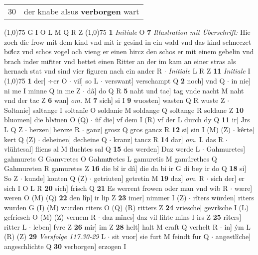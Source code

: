 \documentclass[8pt,a4paper,notitlepage]{article}
\begin{document}
\begin{table}[ht]
\begin{minipage}[t]{0.5\linewidth}
\begin{tabular}{rl}
30 & der knabe alsus \textbf{verborgen} wart\\ 
\end{tabular}
\scriptsize
\line(1,0){75} \newline
G I O L M Q R Z \newline
\line(1,0){75} \newline
\textbf{1} \textit{Initiale} O  \textbf{7} \textit{Illustration mit Überschrift:} Hie zoch die frow mit dem kind vnd mit ir gesind in ein wald vnd das kind schneczet boͯlcz vnd schos vogel och vieng er einen hircz den schos er mit einem gebelin vnd brach inder muͦtter vnd bettet einen Ritter an der im kam an einer stras als hernach stat vnd sind vier figuren nach ein ander R   $\cdot$ \textit{Initiale} L R Z  \textbf{11} \textit{Initiale} I  \newline
\line(1,0){75} \newline
\textbf{1} der] ÷er O  $\cdot$ vil] so L  $\cdot$ verswant] verschampt Q \textbf{2} noch] vnd Q  $\cdot$ in nie] ni me I minne Q in me Z  $\cdot$ dâ] do Q R \textbf{5} naht und tac] tag vnde nacht M naht vnd der tac Z \textbf{6} wan] \textit{om.} M \textbf{7} sich] si I \textbf{9} wuosten] wasten Q R wuste Z  $\cdot$ Soltanie] saltange I soltanîe O soldanie M soldange Q soltange R soldane Z \textbf{10} bluomen] die blvͦmen O (Q)  $\cdot$ ûf die] vf dem I (R) vf der L durch dy Q \textbf{11} ir] Jrs L Q Z  $\cdot$ herzen] hercze R  $\cdot$ ganz] grosz Q gros gancz R \textbf{12} si] sin I (M) (Z)  $\cdot$ kêrte] kert Q (Z)  $\cdot$ deheinen] decheine Q  $\cdot$ kranz] tancz R \textbf{14} dar] \textit{om.} L das R  $\cdot$ vlühtesal] fliens al M fluchtes sal Q \textbf{15} des werden] Daz werde L  $\cdot$ Gahmuretes] gahmurets G Gamvretes O Gahmuͯretes L gamuretis M gamúrethes Q Gahmureten R gamuretes Z \textbf{16} die bî ir dâ] die da bi ir G di bey ir do Q \textbf{18} si] So Z  $\cdot$ kunde] konten Q (Z)  $\cdot$ getriuten] getretin M \textbf{19} daz] \textit{om.} R  $\cdot$ sich der] er sich I O L R \textbf{20} sich] frisch Q \textbf{21} Es werrent frowen oder man vnd wib R  $\cdot$ wære] weren O (M) (Q) \textbf{22} den lîp] ir lip Z \textbf{23} imer] nimmer I (Z)  $\cdot$ rîters würden] riters wurden G (I) (M) wurden riters O (Q) (R) ritters Z \textbf{24} vriesche] gevriͤsche I (L) gefriesch O (M) (Z) vernem R  $\cdot$ daz mînes] daz vil lihte mins I irs Z \textbf{25} rîters] ritter L  $\cdot$ leben] fvre Z \textbf{26} mir] im Z \textbf{28} helt] halt M craft Q verhelt R  $\cdot$ in] ým L (R) (Z) \textbf{29} \textit{Versfolge 117.30-29} L   $\cdot$ sit vuor] sie furt M feindt fur Q  $\cdot$ angestlîche] angeschlichte Q \textbf{30} verborgen] erzogen I \newline

\end{minipage}
\end{table}
\end{document}
